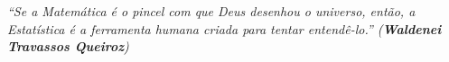
\begin{epigrafe}
\vspace{5cm}


\begin{minipage}{10cm}

\textit{``Se a Matemática é o pincel com que Deus desenhou o universo, então, a Estatística é a ferramenta humana criada para tentar entendê-lo.'' (\textbf{Waldenei Travassos Queiroz})}

\end{minipage}



\end{epigrafe}




